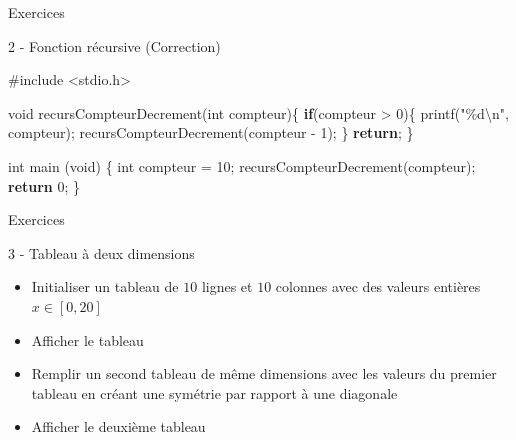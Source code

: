 \documentclass[
  10pt,
  french,
  ignorenonframetext,
  aspectratio=169,
]{beamer}
\newenvironment{Shaded}{}{}
\newcommand{\ControlFlowTok}[1]{\textcolor[rgb]{0.00,0.44,0.13}{\textbf{#1}}}
\newcommand{\DataTypeTok}[1]{\textcolor[rgb]{0.56,0.13,0.00}{#1}}
\newcommand{\DecValTok}[1]{\textcolor[rgb]{0.25,0.63,0.44}{#1}}
\newcommand{\ImportTok}[1]{#1}
\newcommand{\NormalTok}[1]{#1}
\newcommand{\OperatorTok}[1]{\textcolor[rgb]{0.40,0.40,0.40}{#1}}
\newcommand{\PreprocessorTok}[1]{\textcolor[rgb]{0.74,0.48,0.00}{#1}}
\newcommand{\SpecialCharTok}[1]{\textcolor[rgb]{0.25,0.44,0.63}{#1}}
\newcommand{\StringTok}[1]{\textcolor[rgb]{0.25,0.44,0.63}{#1}}
\providecommand{\tightlist}{%
  \setlength{\itemsep}{0pt}\setlength{\parskip}{0pt}}
\begin{document}
\begin{frame}[fragile]{Exercices}
\protect\hypertarget{exercices-4}{}
\begin{block}{2 - Fonction récursive (Correction)}
\protect\hypertarget{fonction-ruxe9cursive-correction}{}
\begin{Shaded}
\begin{Highlighting}[]
\PreprocessorTok{\#include }\ImportTok{\textless{}stdio.h\textgreater{}}

\DataTypeTok{void}\NormalTok{ recursCompteurDecrement}\OperatorTok{(}\DataTypeTok{int}\NormalTok{ compteur}\OperatorTok{)\{}
    \ControlFlowTok{if}\OperatorTok{(}\NormalTok{compteur }\OperatorTok{\textgreater{}} \DecValTok{0}\OperatorTok{)\{}
\NormalTok{        printf}\OperatorTok{(}\StringTok{"\%d}\SpecialCharTok{\textbackslash{}n}\StringTok{"}\OperatorTok{,}\NormalTok{ compteur}\OperatorTok{);}
\NormalTok{        recursCompteurDecrement}\OperatorTok{(}\NormalTok{compteur }\OperatorTok{{-}} \DecValTok{1}\OperatorTok{);}
    \OperatorTok{\}}
    \ControlFlowTok{return}\OperatorTok{;}
\OperatorTok{\}}

\DataTypeTok{int}\NormalTok{ main }\OperatorTok{(}\DataTypeTok{void}\OperatorTok{)} \OperatorTok{\{}
    \DataTypeTok{int}\NormalTok{ compteur }\OperatorTok{=} \DecValTok{10}\OperatorTok{;}
\NormalTok{    recursCompteurDecrement}\OperatorTok{(}\NormalTok{compteur}\OperatorTok{);}
    \ControlFlowTok{return} \DecValTok{0}\OperatorTok{;}
\OperatorTok{\}}
\end{Highlighting}
\end{Shaded}
\end{block}
\end{frame}

\begin{frame}{Exercices}
\protect\hypertarget{exercices-5}{}
\begin{block}{3 - Tableau à deux dimensions}
\protect\hypertarget{tableau-uxe0-deux-dimensions}{}
\begin{itemize}
\tightlist
\item
  Initialiser un tableau de \(10\) lignes et \(10\) colonnes avec des
  valeurs entières \(x \in [0,20]\)
\item
  Afficher le tableau
\item
  Remplir un second tableau de même dimensions avec les valeurs du
  premier tableau en créant une symétrie par rapport à une diagonale
\item
  Afficher le deuxième tableau
\end{itemize}
\end{block}
\end{frame}
\end{document}
